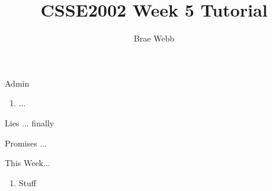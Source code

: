 \documentclass[week5]{csse2002}
\author{Brae Webb}
\title{CSSE2002 Week 5 Tutorial}
\begin{document}
\begin{frame}
\maketitle
\end{frame}

\begin{topic}{Admin}
\begin{enumerate}
    \item ...
\end{enumerate}
\end{topic}

\begin{topic}{Lies}
... finally
\end{topic}

\begin{topic}{Promises}
...
\end{topic}

\begin{topic}{This Week...}
\begin{enumerate}
    \item Stuff
\end{enumerate}
\end{topic}
\end{document}
